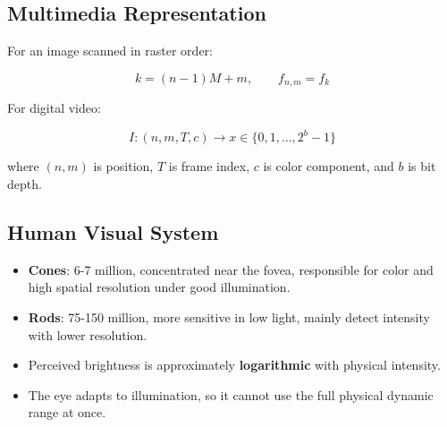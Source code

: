 \subsection{Multimedia Representation}

\begin{center}
\end{center}

For an image scanned in raster order:

\[
k = (n-1)M + m, \qquad f_{n,m} = f_k
\]

For digital video:

\[
I : (n,m,T,c) \rightarrow x \in \{0,1,\ldots,2^b-1\}
\]

where $(n,m)$ is position, $T$ is frame index, $c$ is color component, and $b$ is bit depth.

\subsection{Human Visual System}

\begin{itemize}
  \item \textbf{Cones}: 6-7 million, concentrated near the fovea, responsible for color and high spatial resolution under good illumination.
  \item \textbf{Rods}: 75-150 million, more sensitive in low light, mainly detect intensity with lower resolution.
  \item Perceived brightness is approximately \textbf{logarithmic} with physical intensity.
  \item The eye adapts to illumination, so it cannot use the full physical dynamic range at once.
\end{itemize}

